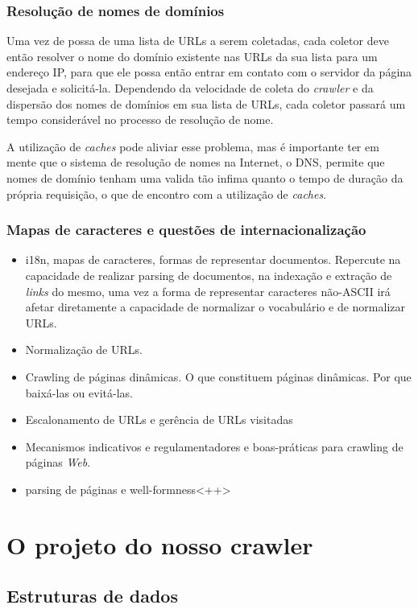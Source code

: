 \documentclass[10pt,twocolumn]{article}
\begin{document}
\subsubsection{Resolução de nomes de domínios}
Uma vez de possa de uma lista de URLs a serem coletadas, cada coletor
deve então resolver o nome do domínio existente nas URLs da sua lista
para um endereço IP, para que ele possa então entrar em contato com o
servidor da página desejada e solicitá-la. Dependendo da velocidade de
coleta do \emph{crawler} e da dispersão dos nomes de domínios em sua
lista de URLs, cada coletor passará um tempo considerável no processo de
resolução de nome.

A utilização de \emph{caches} pode aliviar esse problema, mas é
importante ter em mente que o sistema de resolução de nomes na Internet,
o DNS, permite que nomes de domínio tenham uma valida tão infima quanto
o tempo de duração da própria requisição, o que de encontro com a
utilização de \emph{caches}.

\subsubsection{Mapas de caracteres e questões de internacionalização}

\begin{itemize}
\item i18n, mapas de caracteres, formas de representar documentos.
Repercute na capacidade de realizar parsing de documentos, na indexação
e extração de \emph{links} do mesmo, uma vez a forma de representar
caracteres não-ASCII irá afetar diretamente a capacidade de normalizar o
vocabulário e de normalizar URLs.
\item Normalização de URLs.
\item Crawling de páginas dinâmicas. O que constituem páginas dinâmicas.
Por que baixá-las ou evitá-las.
\item Escalonamento de URLs e gerência de URLs visitadas
\item Mecanismos indicativos e regulamentadores e boas-práticas para
crawling de páginas \emph{Web}. 
\item{parsing de páginas e well-formness}<++>
\end{itemize}


\section{O projeto do nosso crawler}

\subsection{Estruturas de dados}
\end{document}
